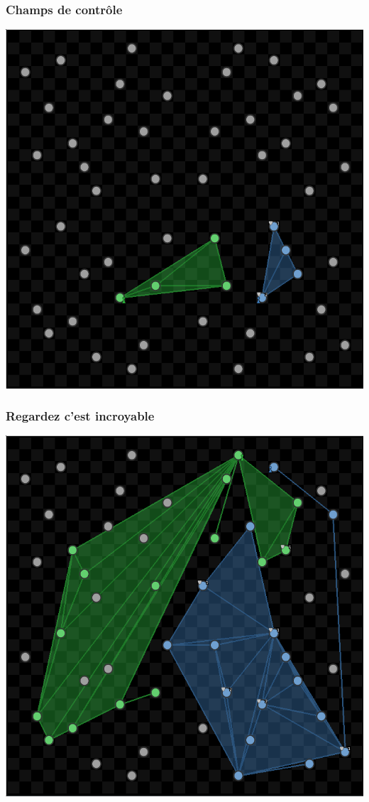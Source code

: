\documentclass{beamer}
\begin{document}
\begin{frame}
    \begin{center}
        \frametitle{Champs de contrôle}
        \includegraphics[height=0.8\textheight]{gui_triangle}
    \end{center}
\end{frame}

\begin{frame}
    \begin{center}
        \frametitle{Regardez c'est incroyable}
        \includegraphics[height=0.8\textheight]{gui_full}
    \end{center}
\end{frame}
\end{document}
